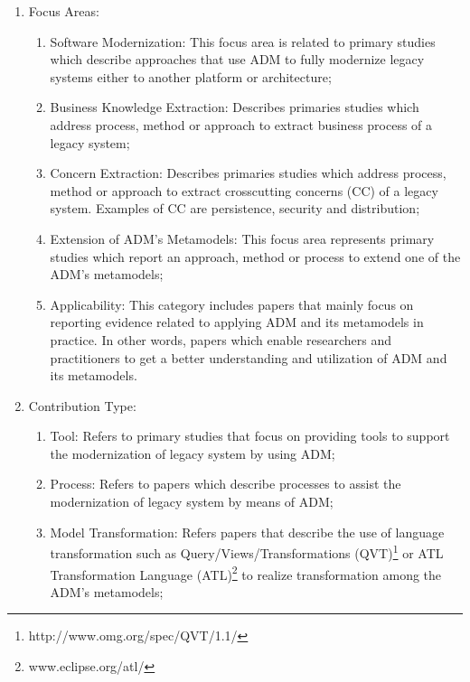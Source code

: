\begin{enumerate}

\item Focus Areas: 

\begin{enumerate}

\item Software Modernization: This focus area is related to primary studies which describe approaches that use ADM to fully modernize legacy systems either to another platform  or architecture;

\item Business Knowledge Extraction: Describes primaries studies which address process, method or approach to extract business process of a legacy system;

\item Concern Extraction: Describes primaries studies which address process, method or approach to extract crosscutting concerns (CC) of a legacy system. Examples of CC are persistence, security and distribution;

\item Extension of ADM's Metamodels: This focus area represents primary studies which report an approach, method or process to extend one of the ADM's metamodels;

\item Applicability: This category includes papers that mainly focus on reporting evidence related to applying ADM and its metamodels in practice. In other words, papers which enable researchers and practitioners to get a better understanding and utilization of ADM and its metamodels.

\end{enumerate}

\item Contribution Type:

\begin{enumerate}

\item Tool: Refers to primary studies that focus on providing tools to support the modernization of legacy system by using ADM; 

\item Process: Refers to papers which describe processes to assist the modernization of legacy system by means of ADM;

\item Model Transformation: Refers papers that describe the use of language transformation such as Query/Views/Transformations (QVT)\footnote{http://www.omg.org/spec/QVT/1.1/} or ATL Transformation Language (ATL)\footnote{www.eclipse.org/atl/} to realize transformation among the ADM's metamodels;


\end{enumerate}
\end{enumerate}
